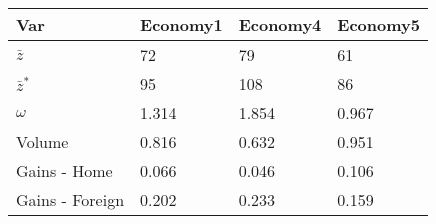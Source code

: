 \begin{tabular}{llll}
\hline
Var             & Economy1 & Economy4 & Economy5 \\ \hline
$\bar{z}$       & 72       & 79       & 61       \\
$\bar{z}^*$     & 95       & 108      & 86       \\
$\omega$        & 1.314    & 1.854    & 0.967    \\
Volume          & 0.816    & 0.632    & 0.951    \\
Gains - Home    & 0.066    & 0.046    & 0.106    \\
Gains - Foreign & 0.202    & 0.233    & 0.159    \\ \hline
\end{tabular}
